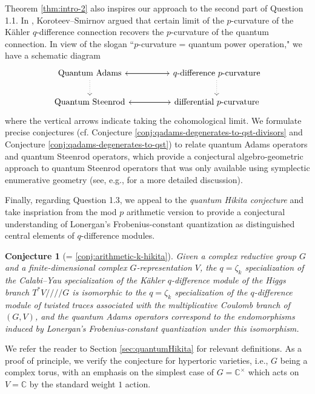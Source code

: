 \documentclass[reqno]{amsart}
\numberwithin{equation}{section}
\numberwithin{equation}{section}
\numberwithin{equation}{section}
\newtheorem{conj}[thm]{Conjecture}
\theoremstyle{definition}
\theoremstyle{remark}
\theoremstyle{remark}
\begin{document}
Theorem \ref{thm:intro-2} also inspires our approach to the second part of Question 1.1. In \cite{koroteev-smirnov}, Koroteev--Smirnov argued that certain limit of the $p$-curvature of the K\"ahler $q$-difference connection recovers the $p$-curvature of the quantum connection. In view of the slogan ``$p$-curvature = quantum power operation," we have a schematic diagram
\begin{equation}
    \begin{tikzcd}
\text{Quantum Adams} \arrow[d, dotted] \arrow[rr] &  & q\text{-difference } p\text{-curvature} \arrow[d, dotted] \arrow[ll] \\
\text{Quantum Steenrod} \arrow[rr]                &  & \text{differential } p\text{-curvature} \arrow[ll]                      
\end{tikzcd}
\end{equation}
where the vertical arrows indicate taking the cohomological limit. We formulate precise conjectures (cf. Conjecture \ref{conj:qadams-degenerates-to-qst-divisors} and Conjecture \ref{conj:qadams-degenerates-to-qst}) to relate quantum Adams operators and quantum Steenrod operators, which provide a conjectural algebro-geometric approach to quantum Steenrod operators that was only available using symplectic enumerative geometry (see, e.g., \cite[Section 3.1]{bai-lee} for a more detailed discussion).

Finally, regarding Question 1.3, we appeal to the \emph{quantum Hikita conjecture} \cite{KMP21} and take inspriation from the mod $p$ arithmetic version \cite{bai-lee} to provide a conjectural understanding of Lonergan's Frobenius-constant quantization as distinguished central elements of $q$-difference modules.

\begin{conj}[= \cref{conj:arithmetic-k-hikita}]
    Given a complex reductive group $G$ and a finite-dimensional complex $G$-representation $V$, the $q = \zeta_k$ specialization of the Calabi--Yau specialization of the K\"ahler $q$-difference module of the Higgs branch $T^*V  /\!\!/\!\!/\!\!/ G$ is isomorphic to the $q = \zeta_k$ specialization of the $q$-difference module of twisted traces associated with the multiplicative Coulomb branch of $(G,V)$, and the quantum Adams operators correspond to the endomorphisms induced by Lonergan's Frobenius-constant quantization under this isomorphism.
\end{conj}

We refer the reader to Section \ref{sec:quantumHikita} for relevant definitions. As a proof of principle, we verify the conjecture for hypertoric varieties, i.e., $G$ being a complex torus, with an emphasis on the simplest case of $G = \mathbb{C}^{\times}$ which acts on $V = \mathbb{C}$ by the standard weight $1$ action.
\end{document}
